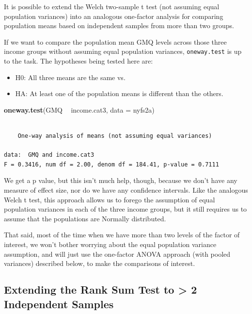 \documentclass[
]{book}
\newenvironment{Shaded}{\begin{snugshade}}{\end{snugshade}}
\newcommand{\DataTypeTok}[1]{\textcolor[rgb]{0.13,0.29,0.53}{#1}}
\newcommand{\KeywordTok}[1]{\textcolor[rgb]{0.13,0.29,0.53}{\textbf{#1}}}
\newcommand{\NormalTok}[1]{#1}
\newcommand{\OperatorTok}[1]{\textcolor[rgb]{0.81,0.36,0.00}{\textbf{#1}}}
\newcommand{\StringTok}[1]{\textcolor[rgb]{0.31,0.60,0.02}{#1}}
\providecommand{\tightlist}{%
  \setlength{\itemsep}{0pt}\setlength{\parskip}{0pt}}
\begin{document}
It is possible to extend the Welch two-sample t test (not assuming equal population variances) into an analogous one-factor analysis for comparing population means based on independent samples from more than two groups.

If we want to compare the population mean GMQ levels across those three income groups without assuming equal population variances, \texttt{oneway.test} is up to the task. The hypotheses being tested here are:

\begin{itemize}
\tightlist
\item
  H0: All three means are the same vs.
\item
  HA: At least one of the population means is different than the others.
\end{itemize}

\begin{Shaded}
\begin{Highlighting}[]
\KeywordTok{oneway.test}\NormalTok{(GMQ }\OperatorTok{~}\StringTok{ }\NormalTok{income.cat3, }\DataTypeTok{data =}\NormalTok{ nyfs2a)}
\end{Highlighting}
\end{Shaded}

\begin{verbatim}

	One-way analysis of means (not assuming equal variances)

data:  GMQ and income.cat3
F = 0.3416, num df = 2.00, denom df = 184.41, p-value = 0.7111
\end{verbatim}

We get a p value, but this isn't much help, though, because we don't have any measure of effect size, nor do we have any confidence intervals. Like the analogous Welch t test, this approach allows us to forego the assumption of equal population variances in each of the three income groups, but it still requires us to assume that the populations are Normally distributed.

That said, most of the time when we have more than two levels of the factor of interest, we won't bother worrying about the equal population variance assumption, and will just use the one-factor ANOVA approach (with pooled variances) described below, to make the comparisons of interest.

\hypertarget{extending-the-rank-sum-test-to-2-independent-samples}{%
\subsection{Extending the Rank Sum Test to \textgreater{} 2 Independent Samples}\label{extending-the-rank-sum-test-to-2-independent-samples}}
\end{document}
